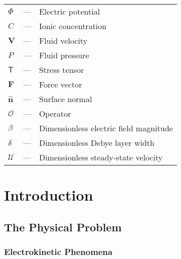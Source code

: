 \documentclass[MSc,beforeExam]{iitcsthesis}
\newcommand\bV{\boldsymbol{V}}
\newcommand\bF{\boldsymbol{F}}
\newcommand\bnhat{\hat{\boldsymbol{n}}}
\newcommand\cO{\mathcal{O}}
\newcommand\cU{\mathscr{U}}
\newcommand\tT{\mathsf{T}}
\begin{document}
\abbreviationsAndNotationsEnglish

\begin{longtable}{lcl}
$\varPhi$ 	& --- & Electric potential \\
$C$ 		& --- & Ionic concentration \\
$\bV$		& --- & Fluid velocity \\
$P$			& --- & Fluid pressure \\
$\tT$		& --- & Stress tensor \\
$\bF$		& --- & Force vector \\
$\bnhat$	& --- & Surface normal \\
$\cO$ 		& --- & Operator \\
$\beta$		& --- & Dimensionless electric field magnitude \\
$\delta$	& --- & Dimensionless Debye layer width \\
$\cU$		& --- & Dimensionless steady-state velocity 
\end{longtable}


\chapter{Introduction}

\section{The Physical Problem}
\subsection{Electrokinetic Phenomena}
\end{document}
